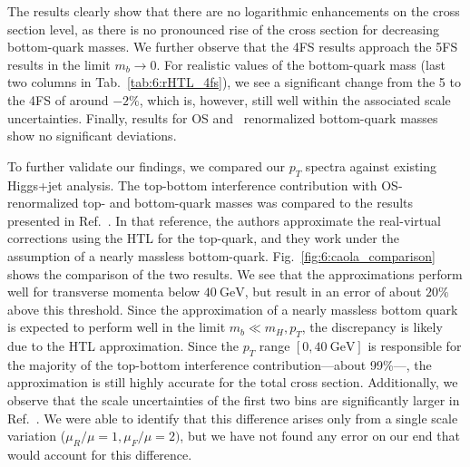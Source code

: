 The results clearly show that there are no logarithmic enhancements on the cross section level, as there is no pronounced rise of the cross section for decreasing bottom-quark masses. We further observe that the 4\acs{FS} results approach the 5\acs{FS} results in the limit $m_b \rightarrow 0$. For realistic values of the bottom-quark mass (last two columns in Tab.~\ref{tab:6:rHTL_4fs}), we see a significant change from the 5 to the 4\acs{FS} of around $-2\%$, which is, however, still well within the associated scale uncertainties. Finally, results for \acs{OS} and \MS\ renormalized bottom-quark masses show no significant deviations.

To further validate our findings, we compared our $p_T$ spectra against existing Higgs+jet analysis. The top-bottom interference contribution with \acs{OS}-renormalized top- and bottom-quark masses was compared to the results presented in Ref.~\cite{Caola:2018zye}. In that reference, the authors approximate the real-virtual corrections using the \acs{HTL} for the top-quark, and they work under the assumption of a nearly massless bottom-quark. Fig.~\ref{fig:6:caola_comparison} shows the comparison of the two results. We see that the approximations perform well for transverse momenta below $40\ \mathrm{GeV}$, but result in an error of about $20\%$ above this threshold. Since the approximation of a nearly massless bottom quark is expected to perform well in the limit $m_b \ll m_H, p_T$, the discrepancy is likely due to the \acs{HTL} approximation. Since the $p_T$ range $[0, 40\ \mathrm{GeV}]$ is responsible for the majority of the top-bottom interference contribution---about 99\%---, the approximation is still highly accurate for the total cross section. Additionally, we observe that the scale uncertainties of the first two bins are significantly larger in Ref.~\cite{Caola:2018zye}. We were able to identify that this difference arises only from a single scale variation ($\mu_R/\mu = 1, \mu_F/\mu = 2)$, but we have not found any error on our end that would account for this difference.
